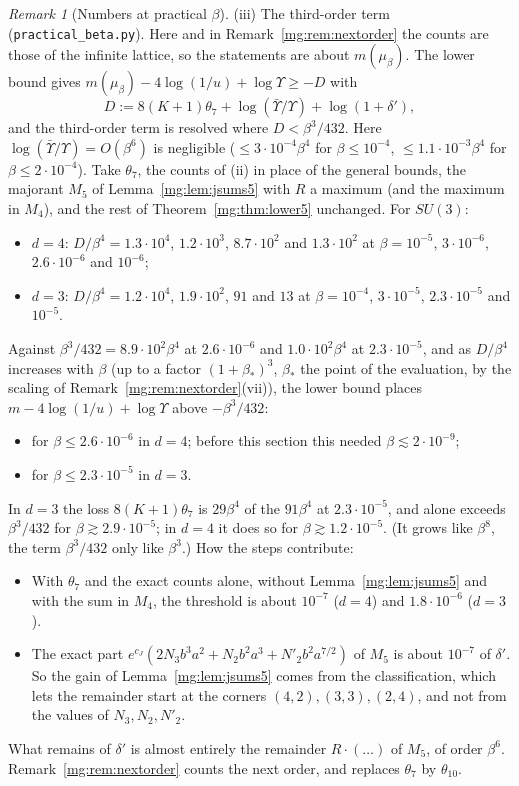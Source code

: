 \documentclass[11pt,a4paper]{article}
\theoremstyle{definition}
\theoremstyle{remark}
\newtheorem{remark}[theorem]{Remark}
\begin{document}
\begin{remark}[Numbers at practical $\beta$]
(iii) The third-order term (\texttt{practical\_beta.py}). Here and in Remark~\ref{mg:rem:nextorder} the counts are those of the infinite lattice, so the statements are about
$m(\mu_\beta)$. The lower bound gives $m(\mu_\beta)-4\log(1/u)+\log\Upsilon\ge-D$ with
\[
D:=8(K+1)\theta_7+\log(\bar\Upsilon/\Upsilon)+\log(1+\delta'),
\]
and the third-order term is resolved where $D<\beta^3/432$. Here $\log(\bar\Upsilon/\Upsilon)=O(\beta^6)$ is negligible ($\le3\cdot10^{-4}\beta^4$ for $\beta\le10^{-4}$, $\le1.1\cdot10^{-3}\beta^4$ for
$\beta\le2\cdot10^{-4}$). Take $\theta_7$, the counts of (ii) in place of
the general bounds, the majorant $M_5$ of Lemma~\ref{mg:lem:jsums5} with $R$ a maximum (and the maximum in $M_4$), and the rest of Theorem~\ref{mg:thm:lower5} unchanged. For $SU(3)$:
\begin{itemize}
\item $d=4$: $D/\beta^4=1.3\cdot10^4$, $1.2\cdot10^3$, $8.7\cdot10^2$ and $1.3\cdot10^2$ at $\beta=10^{-5}$, $3\cdot10^{-6}$, $2.6\cdot10^{-6}$ and $10^{-6}$;
\item $d=3$: $D/\beta^4=1.2\cdot10^4$, $1.9\cdot10^2$, $91$ and $13$ at $\beta=10^{-4}$, $3\cdot10^{-5}$, $2.3\cdot10^{-5}$ and $10^{-5}$.
\end{itemize}
Against $\beta^3/432=8.9\cdot10^2\beta^4$ at $2.6\cdot10^{-6}$ and $1.0\cdot10^2\beta^4$ at $2.3\cdot10^{-5}$, and as $D/\beta^4$ increases with $\beta$ (up to a factor $(1+\beta_*)^3$, $\beta_*$ the point of the
evaluation, by the scaling of Remark~\ref{mg:rem:nextorder}(vii)), the lower bound places $m-4\log(1/u)+\log\Upsilon$
above $-\beta^3/432$:
\begin{itemize}
\item for $\beta\le2.6\cdot10^{-6}$ in $d=4$; before this section this needed $\beta\lesssim2\cdot10^{-9}$;
\item for $\beta\le2.3\cdot10^{-5}$ in $d=3$.
\end{itemize}
In $d=3$ the loss $8(K+1)\theta_7$ is $29\beta^4$ of the $91\beta^4$ at $2.3\cdot10^{-5}$, and alone exceeds $\beta^3/432$ for $\beta\gtrsim2.9\cdot10^{-5}$; in $d=4$ it does so for $\beta\gtrsim1.2\cdot10^{-5}$.
(It grows like $\beta^8$, the term $\beta^3/432$ only like $\beta^3$.) How the steps contribute:
\begin{itemize}
\item With $\theta_7$ and the exact counts alone, without Lemma~\ref{mg:lem:jsums5} and with the sum in $M_4$, the threshold is about $10^{-7}$ ($d=4$) and $1.8\cdot10^{-6}$ ($d=3$).
\item The exact part $e^{c_J}(2N_3b^3a^2+N_2b^2a^3+N'_2b^2a^{7/2})$ of $M_5$ is about $10^{-7}$ of $\delta'$. So the gain of Lemma~\ref{mg:lem:jsums5} comes from the classification, which lets
the remainder start at the corners $(4,2),(3,3),(2,4)$, and not from the values of $N_3,N_2,N'_2$.
\end{itemize}
What remains of $\delta'$ is almost entirely the remainder $R\cdot(\dots)$ of $M_5$, of order $\beta^6$. Remark~\ref{mg:rem:nextorder} counts the next order, and replaces $\theta_7$ by $\theta_{10}$.
\end{remark}
\end{document}
